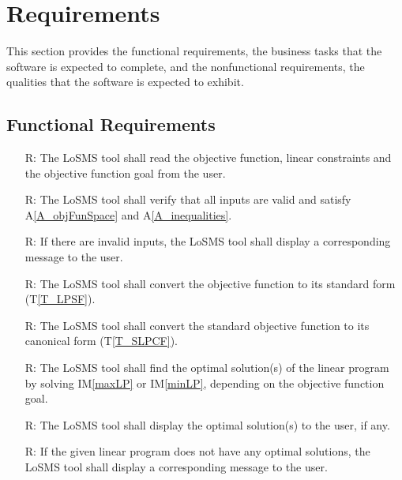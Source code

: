 \documentclass[12pt]{article}
\newcommand{\tref}[1]{T\ref{#1}}
\newcommand{\aref}[1]{A\ref{#1}}
\newcommand{\iref}[1]{IM\ref{#1}}
\newcounter{reqnum} %
\newcommand{\famname}{LoSMS} %
\begin{document}

\section{Requirements} \label{Sec_Requirements}

This section provides the functional requirements, the business tasks that the
software is expected to complete, and the nonfunctional requirements, the
qualities that the software is expected to exhibit.

\subsection{Functional Requirements}

\noindent 
\begin{itemize}
	\item[R\refstepcounter{reqnum}\thereqnum \label{R_Inputs}:] The \famname{} 
	tool shall read the objective function, linear constraints and the 
	objective function goal from the user.
	
	\item[R\refstepcounter{reqnum}\thereqnum \label{R_HandleInputErrors}:] The 
	\famname{} tool shall verify that all inputs are valid and satisfy 
	\aref{A_objFunSpace} and \aref{A_inequalities}.
	
	\item[R\refstepcounter{reqnum}\thereqnum \label{R_DisplayErrorMsg}:] If 
	there are invalid inputs, the \famname{} tool shall display a corresponding 
	message to the user.
	
	\item[R\refstepcounter{reqnum}\thereqnum \label{R_StandardForm}:] The 
	\famname{} tool shall convert the objective function to its standard form 
	(\tref{T_LPSF}).
	
	\item[R\refstepcounter{reqnum}\thereqnum \label{R_CanonicalForm}:] The 
	\famname{} tool shall convert the standard objective function to its 
	canonical form (\tref{T_SLPCF}).

	\item[R\refstepcounter{reqnum}\thereqnum \label{R_Calculate}:] The 
	\famname{} tool shall find the optimal solution(s) of the linear program by 
	solving \iref{maxLP} or \iref{minLP}, depending on the objective function 
	goal.
	
	\item[R\refstepcounter{reqnum}\thereqnum \label{R_Output}:] The \famname{} 
	tool shall display the optimal solution(s) to the user, if any.
	
	\item[R\refstepcounter{reqnum}\thereqnum \label{R_OutputError}:] If the 
	given linear program does not have any optimal solutions, the \famname{} 
	tool shall display a corresponding message to the user.
\end{itemize}
\end{document}
